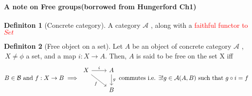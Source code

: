 \documentclass{article}
\theoremstyle{definition}
\theoremstyle{definition}
\newtheorem{definition}{Definiton}[section]
\begin{document}
\paragraph{A note on Free groups(borrowed from Hungerford Ch1)}
\begin{definition}[Concrete category] %
	A category $ \mathcal{A}  $ , along with a \textcolor{red}{ faithful functor to $ Set $ }
\end{definition}

\begin{definition}[Free object on a set] %
Let $ A $ be an object of concrete category $ \mathcal{A}  $ ,$ \, X \neq \phi $ a set, and a map $ i:X \rightarrow A $. Then, $ A $ is said to be free on the set X iff
\begin{equation*}
B\in \mathcal{B} \text{ and }f:X\rightarrow B\implies
\begin{tikzcd}
	X \arrow{r}{i} \arrow [swap]{dr}{f} & A \arrow{d}{g} \\ & B
\end{tikzcd}
\text{ commutes i.e. }\exists! g \in \mathcal{A}(A,B)\text{ such that } g \circ i = f
\end{equation*}




\end{definition}
\end{document}
